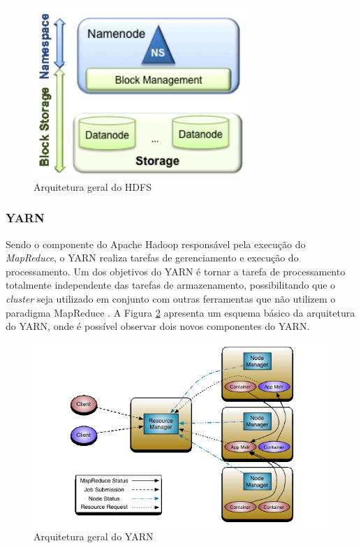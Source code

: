 \begin{figure}[!hbtn]
   \centering
   \includegraphics[width=8cm]{figuras/Figura07-HDFS.png}
   \caption{Arquitetura geral do HDFS \cite{HDFS}}
   \label{fig:ArqHDFS}
\end{figure}

\subsubsection{YARN}
Sendo o componente do Apache Hadoop responsável pela execução do \emph{MapReduce}, o YARN realiza tarefas de gerenciamento e execução do processamento. Um dos objetivos do YARN é tornar a tarefa de processamento totalmente independente das tarefas de armazenamento, possibilitando que o \textit{cluster} seja utilizado em conjunto com outras ferramentas que não utilizem o paradigma MapReduce \cite{Vavilapalli}. A Figura \ref{fig:ArqYARN} apresenta um esquema básico da arquitetura do YARN, onde é possível observar dois novos componentes do YARN.

\begin{figure}[!hbtn]
   \centering
   \includegraphics[width=12cm]{figuras/Figura06-YarnArch.png}
   \caption{Arquitetura geral do YARN \cite{YARN}}
   \label{fig:ArqYARN}
\end{figure}


